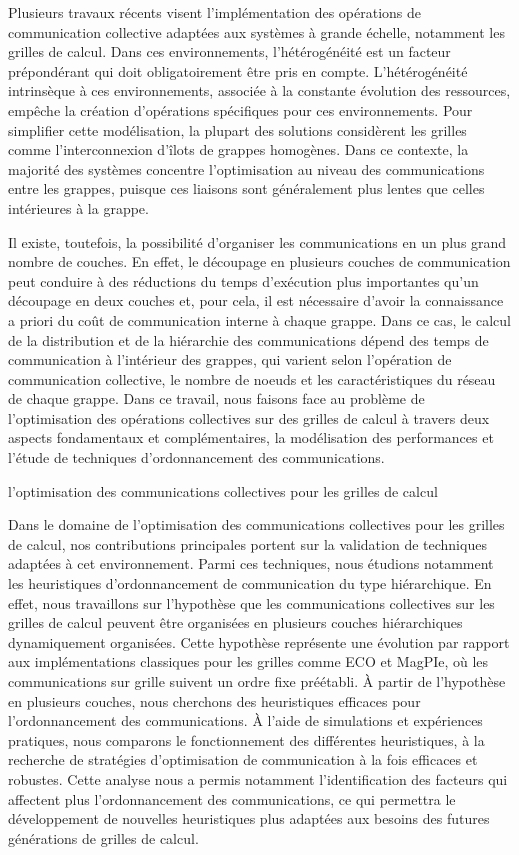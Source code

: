 \documentclass[a4paper]{book}
\begin{document}
Plusieurs travaux récents visent l'implémentation des opérations de communication collective adaptées aux systèmes à grande échelle, notamment les grilles de calcul. Dans ces environnements, l'hétérogénéité est un facteur prépondérant qui doit obligatoirement être pris en compte. L'hétérogénéité intrinsèque à ces environnements, associée à la constante évolution des ressources, empêche la création d'opérations spécifiques pour ces environnements. Pour simplifier cette modélisation, la plupart des solutions considèrent les grilles comme l'interconnexion d'îlots de grappes homogènes. Dans ce contexte, la majorité des systèmes concentre l'optimisation au niveau des communications entre les grappes, puisque ces liaisons sont généralement plus lentes que celles intérieures à la grappe.

Il existe, toutefois, la possibilité d'organiser les communications en un plus grand nombre de couches. En effet, le découpage en plusieurs couches de communication peut conduire à des réductions du temps d'exécution plus importantes qu'un découpage en deux couches et, pour cela, il est nécessaire d'avoir la connaissance a priori du coût de communication interne à chaque grappe. Dans ce cas, le calcul de la distribution et de la hiérarchie des communications dépend des temps de communication à l'intérieur des
grappes, qui varient selon l'opération de communication collective, le nombre de noeuds et les caractéristiques du réseau de chaque grappe.
Dans ce travail, nous faisons face au problème de l'optimisation des opérations collectives sur des grilles de calcul à travers deux aspects fondamentaux et complémentaires, la modélisation des performances et l'étude de techniques d'ordonnancement des communications.


l'optimisation des communications collectives pour les grilles de calcul

Dans le domaine de l'optimisation des communications collectives pour les grilles de calcul, nos contributions principales portent sur la validation de techniques adaptées à cet environnement. Parmi ces techniques, nous étudions notamment les heuristiques d'ordonnancement de communication du type hiérarchique. En effet, nous travaillons sur l'hypothèse que les communications collectives sur les grilles de calcul peuvent être organisées en plusieurs couches hiérarchiques dynamiquement organisées. Cette hypothèse représente une évolution par rapport aux implémentations classiques pour les grilles comme ECO et MagPIe, où les communications sur grille suivent un ordre fixe préétabli.
À partir de l'hypothèse en plusieurs couches, nous cherchons des heuristiques efficaces pour l'ordonnancement des communications. À l'aide de simulations et expériences pratiques, nous comparons le fonctionnement des différentes heuristiques, à la recherche de stratégies d'optimisation de communication à la fois efficaces et robustes. Cette analyse nous a permis notamment l'identification des facteurs qui affectent plus l'ordonnancement des communications, ce qui permettra le développement de nouvelles heuristiques plus adaptées aux besoins des futures générations de grilles de calcul.
\end{document}
